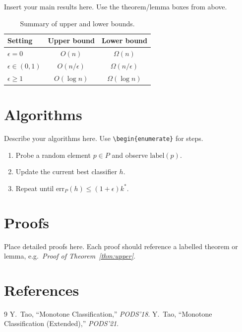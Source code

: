 \documentclass[11pt, a4paper]{article}
\theoremstyle{boxed}
\newcommand{\err}{\mathrm{err}}
\newcommand{\kstar}{k^{*}}
\begin{document}
Insert your main results here. Use the theorem/lemma boxes from above.

\begin{table}[h]
  \centering
  \begin{tabular}{lcc}
    \toprule
    Setting & Upper bound & Lower bound \\
    \midrule
    $\epsilon = 0$     & $O(n)$                & $\Omega(n)$    \\
    $\epsilon \in (0,1)$ & $O(n / \epsilon)$   & $\Omega(n/\epsilon)$ \\
    $\epsilon \ge 1$   & $O(\log n)$           & $\Omega(\log n)$ \\
    \bottomrule
  \end{tabular}
  \caption{Summary of upper and lower bounds.}
  \label{tab:bounds}
\end{table}

\section{Algorithms}

Describe your algorithms here. Use \verb|\begin{enumerate}| for steps.

\begin{enumerate}[label=\textbf{Step \arabic*.}, leftmargin=*]
  \item Probe a random element $p \in P$ and observe $\mathrm{label}(p)$.
  \item Update the current best classifier $h$.
  \item Repeat until $\err_P(h) \le (1+\epsilon)\kstar$.
\end{enumerate}

\section{Proofs}

Place detailed proofs here. Each proof should reference a labelled
theorem or lemma, e.g.\ \emph{Proof of Theorem~\ref{thm:upper}}.

\section*{References}

\begin{thebibliography}{9}
   Y.~Tao, ``Monotone Classification,'' \emph{PODS'18}.
   Y.~Tao, ``Monotone Classification (Extended),'' \emph{PODS'21}.
\end{thebibliography}
\end{document}
